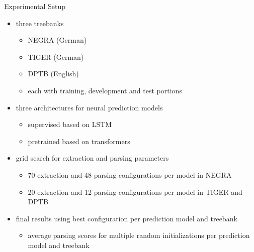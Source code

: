 \documentclass[slides]{subfiles}
\begin{document}
\begin{frame}{Experimental Setup}
        \begin{itemize}
            \item<+-> three treebanks
            \begin{itemize}
                \item NEGRA (German)
                \item TIGER (German)
                \item DPTB (English)
                \item each with training, development and test portions
            \end{itemize}
            \item<+-> three architectures for neural prediction models
            \begin{itemize}
                \item supervised based on LSTM \citep{Hoc97,vaswani2016supertagging, Cor20, StaSte20}
                \item pretrained based on transformers\\\citep[BERT-base, BERT-large or equivalent;][]{vaswani2017attention, Devlin2019}
            \end{itemize}
            \item<+-> grid search for extraction and parsing parameters
            \begin{itemize}
                \item 70 extraction and 48 parsing configurations per model in NEGRA
                \item 20 extraction and 12 parsing configurations per model in TIGER and DPTB
            \end{itemize}
            \item<+-> final results using best configuration per prediction model and treebank
            \begin{itemize}
                \item average parsing scores for multiple random initializations per prediction model and treebank
            \end{itemize}
        \end{itemize}
    \end{frame}
\end{document}
